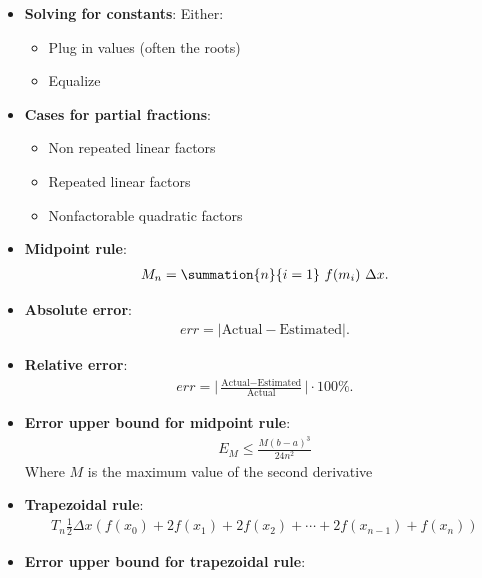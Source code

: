 \documentclass{report}
\begin{document}
\begin{itemize}
        \item \textbf{Solving for constants}:
            Either:
            \begin{itemize}
                \item Plug in values (often the roots)
                \item Equalize 
            \end{itemize}
        \item \textbf{Cases for partial fractions}:
            \begin{itemize}
                \item Non repeated linear factors
                \item Repeated linear factors
                \item Nonfactorable quadratic factors
            \end{itemize}
        \item \textbf{Midpoint rule}:
            \begin{align*}
                M_{n} = \summation{n}{i=1}\ f(m_{i})\ \Delta x 
            .\end{align*}
        \item \textbf{Absolute error}:
            \begin{align*}
                err = \bigg|\text{Actual} - \text{Estimated}\bigg|
            .\end{align*}
        \item \textbf{Relative error}:
            \begin{align*}
                err = \bigg|\frac{\text{Actual} - \text{Estimated}}{\text{Actual}}\bigg| \cdot 100\%
            .\end{align*}
        \item \textbf{Error upper bound for midpoint rule}:
            \begin{align*}
                E_{M} \leq \frac{M(b-a)^3}{24n^2}
            \end{align*}
            Where $M$ is the maximum value of the second derivative
        \item \textbf{Trapezoidal rule}:
            \begin{align*}
                T_n \frac{1}{2} \Delta x \left( f(x_0) + 2f(x_1) + 2f(x_2) + \cdots + 2f(x_{n-1}) + f(x_n) \right)
            \end{align*}
        \item \textbf{Error upper bound for trapezoidal rule}:
            \begin{align*}

\end{align*}
\end{itemize}
\end{document}
